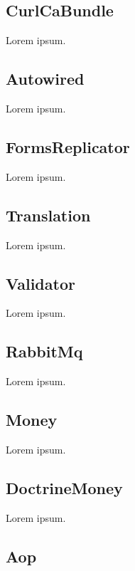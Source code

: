 \subsection{CurlCaBundle} \label{sec:state:curl-ca-bundle}

Lorem ipsum.

\subsection{Autowired} \label{sec:state:autowired}

Lorem ipsum.

\subsection{FormsReplicator} \label{sec:state:forms-replicator}

Lorem ipsum.

\subsection{Translation} \label{sec:state:translation}

Lorem ipsum.

\subsection{Validator} \label{sec:state:validator}

Lorem ipsum.

\subsection{RabbitMq} \label{sec:state:rabbit-mq}

Lorem ipsum.

\subsection{Money} \label{sec:state:money}

Lorem ipsum.

\subsection{DoctrineMoney} \label{sec:state:doctrine-money}

Lorem ipsum.

\subsection{Aop} \label{sec:state:aop}

